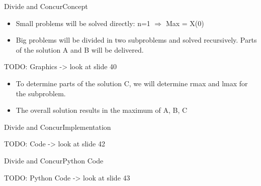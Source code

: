 \begin{frame}{Divide and Concur}{Concept}
	\begin{itemize}
		\item
			Small problems will be solved directly: n=1 $\Rightarrow$ Max = X(0)
		\item
			Big problems will be divided in two subproblems and solved recursively. 
			Parts of the solution A and B will be delivered.
	\end{itemize}
	
	TODO: Graphics -> look at slide 40 \vspace{2em}
	
	\begin{itemize}
		\item
			To determine parts of the solution C, we will determine rmax and lmax for 
			the subproblem.
		\item
			The overall solution results in the maximum of A, B, C
	\end{itemize}
\end{frame}


\begin{frame}{Divide and Concur}{Implementation}
	
	TODO: Code -> look at slide 42 \vspace{2em}
	
\end{frame}


\begin{frame}{Divide and Concur}{Python Code}
	
	TODO: Python Code -> look at slide 43 \vspace{2em}
	
\end{frame}